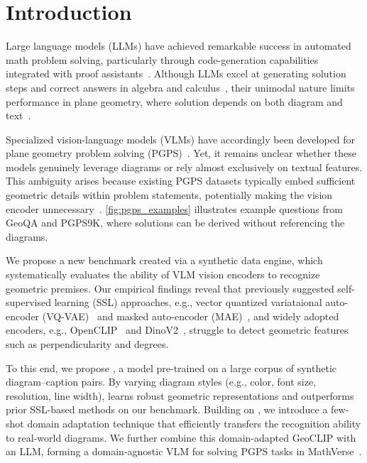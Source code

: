 \section{Introduction}

Large language models (LLMs) have achieved remarkable success in automated math problem solving, particularly through code-generation capabilities integrated with proof assistants~\citep{lean,isabelle,POT,autoformalization,MATH}. Although LLMs excel at generating solution steps and correct answers in algebra and calculus~\citep{math_solving}, their unimodal nature limits performance in plane geometry, where solution depends on both diagram and text~\citep{math_solving}. 

Specialized vision-language models (VLMs) have accordingly been developed for plane geometry problem solving (PGPS)~\citep{geoqa,unigeo,intergps,pgps,GOLD,LANS,geox}. Yet, it remains unclear whether these models genuinely leverage diagrams or rely almost exclusively on textual features. This ambiguity arises because existing PGPS datasets typically embed sufficient geometric details within problem statements, potentially making the vision encoder unnecessary~\citep{GOLD}. \cref{fig:pgps_examples} illustrates example questions from GeoQA and PGPS9K, where solutions can be derived without referencing the diagrams.



We propose a new benchmark created via a synthetic data engine, which systematically evaluates the ability of VLM vision encoders to recognize geometric premises. Our empirical findings reveal that previously suggested self-supervised learning (SSL) approaches, e.g., vector quantized variataional auto-encoder (VQ-VAE)~\citep{unimath} and masked auto-encoder (MAE)~\citep{scagps,geox}, and widely adopted encoders, e.g., OpenCLIP~\citep{clip} and DinoV2~\citep{dinov2}, struggle to detect geometric features such as perpendicularity and degrees. 

To this end, we propose \geoclip{}, a model pre-trained on a large corpus of synthetic diagram–caption pairs. By varying diagram styles (e.g., color, font size, resolution, line width), \geoclip{} learns robust geometric representations and outperforms prior SSL-based methods on our benchmark. Building on \geoclip{}, we introduce a few-shot domain adaptation technique that efficiently transfers the recognition ability to real-world diagrams. We further combine this domain-adapted GeoCLIP with an LLM, forming a domain-agnostic VLM for solving PGPS tasks in MathVerse~\citep{mathverse}. 

